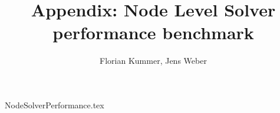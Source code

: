\documentclass[10pt,a4paper]{article}
\title{Appendix: Node Level Solver performance benchmark}
\author{Florian Kummer, Jens Weber}
\begin{document}
\maketitle

{NodeSolverPerformance.tex}
\end{document}
